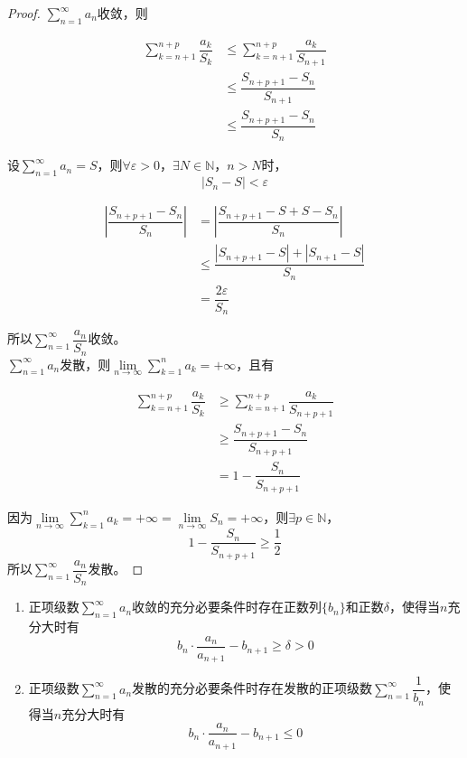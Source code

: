 \begin{proof}
    
    $\sum\limits_{n=1}^{\infty}{a_n}$收敛，则

    \begin{align*}
        \sum_{k=n+1}^{n+p}{\dfrac{a_k}{S_k}} & \leq \sum_{k=n+1}^{n+p}{\dfrac{a_k}{S_{n+1}}}\\
        &\leq \dfrac{S_{n+p+1}-S_{n}}{S_{n+1}}\\
        &\leq \dfrac{S_{n+p+1}-S_{n}}{S_{n}}
    \end{align*}

    设$\sum\limits_{n=1}^{\infty}{a_n} = S$，则$\forall \varepsilon >0$，$\exists N\in\mathbb{N}$，$n>N$时，
    $$|S_n-S|<\varepsilon$$

    \begin{align*}
        \left|\dfrac{S_{n+p+1}-S_{n}}{S_{n}}\right| &= \left|\dfrac{S_{n+p+1}-S+S-S_{n}}{S_{n}}\right|\\
        & \leq \dfrac{|S_{n+p+1}-S|+|S_{n+1}-S|}{S_n}\\
        & = \dfrac{2\varepsilon}{S_n}
    \end{align*}

    所以$\sum\limits_{n=1}^{\infty}{\dfrac{a_n}{S_n}}$收敛。\\
    $\sum\limits_{n=1}^{\infty}{a_n}$发散，则$\lim\limits_{n\to\infty}{\sum\limits_{k=1}^{n}{a_k}}=+\infty$，且有

    \begin{align*}
        \sum_{k=n+1}^{n+p}{\dfrac{a_k}{S_k}} & \geq \sum_{k=n+1}^{n+p}{\dfrac{a_k}{S_{n+p+1}}}\\
        &\geq \dfrac{S_{n+p+1}-S_{n}}{S_{n+p+1}}\\
        &= 1-\dfrac{S_{n}}{S_{n+p+1}}
    \end{align*}

    因为$\lim\limits_{n\to\infty}{\sum\limits_{k=1}^{n}{a_k}}=+\infty=\lim\limits_{n\to\infty}{S_n}=+\infty$，则$\exists p\in\mathbb{N}$，
    $$1-\dfrac{S_{n}}{S_{n+p+1}} \geq \dfrac{1}{2}$$
    所以$\sum\limits_{n=1}^{\infty}{\dfrac{a_n}{S_n}}$发散。

\end{proof}

\begin{theorem}
    
    \begin{enumerate}

        \item 
            正项级数$\sum\limits_{n=1}^{\infty}{a_n}$收敛的充分必要条件时存在正数列$\{b_n\}$和正数$\delta$，使得当$n$充分大时有
            $$b_n \cdot \dfrac{a_n}{a_{n+1}}-b_{n+1}\geq \delta >0$$

        \item 
            正项级数$\sum\limits_{n=1}^{\infty}{a_n}$发散的充分必要条件时存在发散的正项级数$\sum\limits_{n=1}^{\infty}{\dfrac{1}{b_n}}$，使得当$n$充分大时有
            $$b_n  \cdot \dfrac{a_n}{a_{n+1}}-b_{n+1}\leq0$$

    \end{enumerate}

\end{theorem}

